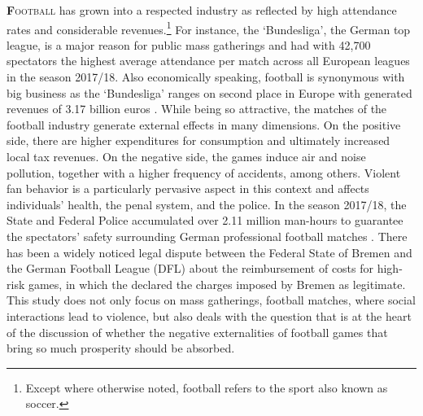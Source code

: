 
\lettrine[lines=2,nindent=0pt]{\color{darkgray}\textbf{F}}{ootball} has grown into a respected industry as reflected by high attendance rates and considerable revenues.\footnote{Except where otherwise noted, football refers to the sport also known as soccer.} For instance, the `Bundesliga', the German top league, is a major reason for public mass gatherings and had with 42,700 spectators the highest average attendance per match across all European leagues in the season 2017/18. Also economically speaking, football is synonymous with big business as the `Bundesliga' ranges on second place in Europe with generated revenues of 3.17 billion euros \citep{deloitte2019report}. While being so attractive, the matches of the football industry generate external effects in many dimensions. On the positive side, there are higher expenditures for consumption and ultimately increased local tax revenues. On the negative side, the games induce air and noise pollution, together with a higher frequency of accidents, among others. Violent fan behavior is a particularly pervasive aspect in this context and affects individuals' health, the penal system, and the police. In the season 2017/18, the State and Federal Police accumulated over 2.11 million man-hours to guarantee the spectators' safety surrounding German professional football matches \citep{zis17_18}. There has been a widely noticed legal dispute between the Federal State of Bremen and the German Football League (DFL) about the reimbursement of costs for high-risk games, in which the \cite{fac_2019} declared the charges imposed by Bremen as legitimate. This study does not only focus on mass gatherings, football matches, where social interactions lead to violence, but also deals with the question that is at the heart of the discussion of whether the negative externalities of football games that bring so much prosperity should be absorbed. 




